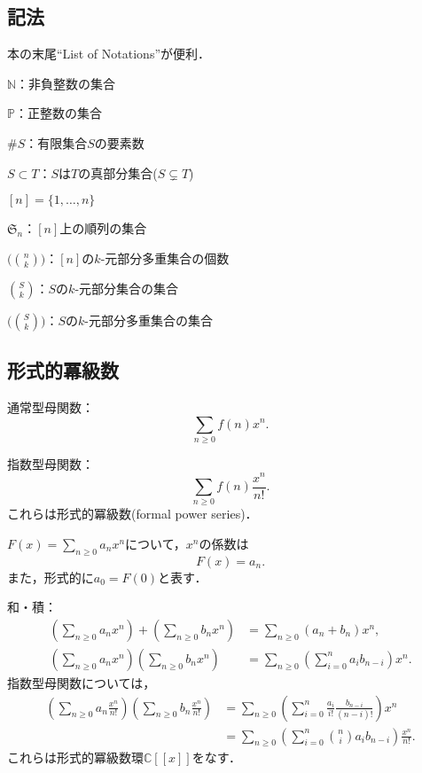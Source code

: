 \documentclass[xelatex,ja=standard,a4paper,14pt,everyparhook=compat]{bxjsarticle}
\newcommand{\paren}[1]{\left(#1\right)}
\newcommand{\bbC}{\mathbb{C}}
\newcommand{\bbN}{\mathbb{N}}
\newcommand{\bbP}{\mathbb{P}}
\newcommand{\frakS}{\mathfrak{S}}
\theoremstyle{definition}
\begin{document}
\subsection*{記法}

本の末尾``List of Notations''が便利．

$\bbN$：非負整数の集合

$\bbP$：正整数の集合

$\# S$：有限集合$S$の要素数

$S \subset T$：$S$は$T$の真部分集合($S \subsetneq T$)

$[n] = \{1,\ldots,n\}$

$\frakS_n$：$[n]$上の順列の集合

$\big( \binom{n}{k} \big)$：$[n]$の$k$-元部分多重集合の個数

$\binom{S}{k}$：$S$の$k$-元部分集合の集合

$\big( \binom{S}{k} \big)$：$S$の$k$-元部分多重集合の集合

\subsection*{形式的冪級数}

通常型母関数： \begin{equation*}
    \sum_{n \geq 0} f(n) x^n.
\end{equation*}

指数型母関数： \begin{equation*}
    \sum_{n \geq 0} f(n) \frac{x^n}{n!}.
\end{equation*}
これらは形式的冪級数(formal power series)．

$F(x) = \sum_{n \geq 0} a_n x^n$について，$x^n$の係数は \begin{equation*}
    [x^n] F(x) = a_n.
\end{equation*}
また，形式的に$a_0 = F(0)$と表す．

和・積： \begin{align*}
    \paren{\sum_{n \geq 0} a_n x^n} + \paren{\sum_{n \geq 0} b_n x^n}
     & = \sum_{n \geq 0} (a_n + b_n) x^n,                                              \\
    \paren{\sum_{n \geq 0} a_n x^n} \paren{\sum_{n \geq 0} b_n x^n}
     & = \sum_{n \geq 0} \paren{\sum_{i=0}^n a_i b_{n-i}} x^n.
\end{align*}
指数型母関数については， \begin{align*}
    \paren{\sum_{n \geq 0} a_n \frac{x^n}{n!}} \paren{\sum_{n \geq 0} b_n \frac{x^n}{n!}}
    & = \sum_{n \geq 0} \paren{\sum_{i=0}^n \frac{a_i}{i!} \frac{b_{n-i}}{(n-i)!}} x^n \\
     & = \sum_{n \geq 0} \paren{\sum_{i=0}^n \binom{n}{i} a_i b_{n-i}} \frac{x^n}{n!}.
\end{align*}
これらは形式的冪級数環$\bbC[[x]]$をなす．
\end{document}
